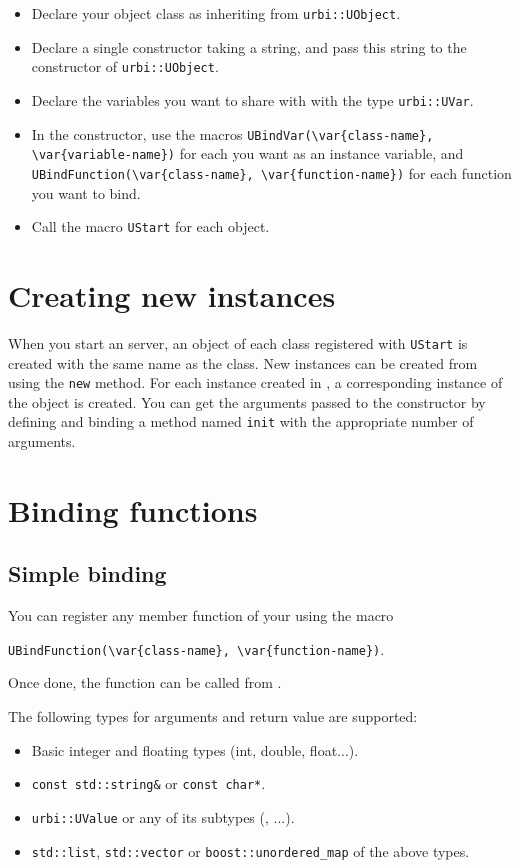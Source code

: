 \begin{itemize}
\item Declare your object class as inheriting from
  \lstinline{urbi::UObject}.
\item Declare a single constructor taking a string, and pass this
  string to the constructor of \lstinline{urbi::UObject}.
\item Declare the variables you want to share with \urbi with the type
  \lstinline{urbi::UVar}.
\item In the constructor, use the macros
  \lstinline|UBindVar(\var{class-name}, \var{variable-name})|
  for each \UVar you want as an instance variable, and
  \lstinline|UBindFunction(\var{class-name}, \var{function-name})| for
  each function you want to bind.
\item Call the macro \lstinline{UStart} for each object.
\end{itemize}

\section{Creating new instances}

When you start an \urbi server, an object of each class registered
with \lstinline{UStart} is created with the same name as the
class. New instances can be created from \urbi using the
\lstinline|new| method. For each instance created in \urbi, a
corresponding instance of the \Cxx object is created. You can get the
arguments passed to the constructor by defining and binding a method
named \lstinline|init| with the appropriate number of arguments.

\section{Binding functions}

\subsection{Simple binding}

You can register any member function of your \UObject using the macro

\lstinline|UBindFunction(\var{class-name}, \var{function-name})|.

Once done, the function can be called from \us.

The following types for arguments and return value are supported:

\begin{itemize}
\item Basic integer and floating types (int, double, float...).
\item \lstinline{const std::string&} or \lstinline{const char*}.
\item \lstinline{urbi::UValue} or any of its subtypes (\UBinary, \UList...).
\item \lstinline{std::list}, \lstinline{std::vector} or
\lstinline{boost::unordered_map} of the above types.
\end{itemize}

